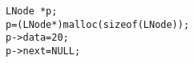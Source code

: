 \begin{lstlisting}[frame=no,backgroundcolor=\color{red!0!green!0!blue!0}]
LNode *p;
p=(LNode*)malloc(sizeof(LNode));
p->data=20;
p->next=NULL;
\end{lstlisting}